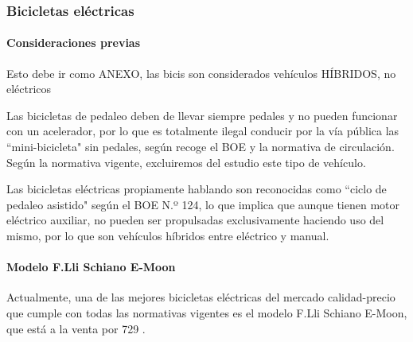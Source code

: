 \subsubsection{Bicicletas eléctricas}

\paragraph{Consideraciones previas}

Esto debe ir como ANEXO, las bicis son considerados vehículos HÍBRIDOS, no eléctricos

Las bicicletas de pedaleo deben de llevar siempre pedales y no pueden funcionar con un acelerador, por lo que es totalmente ilegal conducir por la vía pública las ``mini-bicicleta" sin pedales, según recoge el BOE y la normativa de circulación.  Según la normativa vigente, excluiremos del estudio este tipo de vehículo.

Las bicicletas eléctricas propiamente hablando son reconocidas como ``ciclo de pedaleo asistido" según el BOE N.º 124\cite{boe124}, lo que implica que aunque tienen motor eléctrico auxiliar, no pueden ser propulsadas exclusivamente haciendo uso del mismo, por lo que son vehículos híbridos entre eléctrico y manual.

\paragraph{Modelo F.Lli Schiano E-Moon}

Actualmente, una de las mejores bicicletas eléctricas del mercado calidad-precio que cumple con todas las normativas vigentes es el modelo F.Lli Schiano E-Moon, que está a la venta por 729 .

